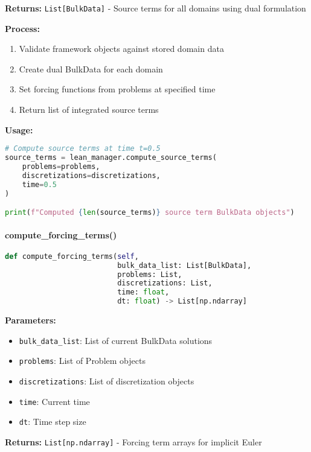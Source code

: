 \textbf{Returns:} \texttt{List[BulkData]} - Source terms for all domains using dual formulation

\textbf{Process:}
\begin{enumerate}
    \item Validate framework objects against stored domain data
    \item Create dual BulkData for each domain
    \item Set forcing functions from problems at specified time
    \item Return list of integrated source terms
\end{enumerate}

\textbf{Usage:}
\begin{lstlisting}[language=Python, caption=Source Terms Usage]
# Compute source terms at time t=0.5
source_terms = lean_manager.compute_source_terms(
    problems=problems,
    discretizations=discretizations,
    time=0.5
)

print(f"Computed {len(source_terms)} source term BulkData objects")
\end{lstlisting}

\paragraph{compute\_forcing\_terms()}\leavevmode
\begin{lstlisting}[language=Python, caption=Compute Forcing Terms Method]
def compute_forcing_terms(self, 
                          bulk_data_list: List[BulkData],
                          problems: List,
                          discretizations: List, 
                          time: float, 
                          dt: float) -> List[np.ndarray]
\end{lstlisting}

\textbf{Parameters:}
\begin{itemize}
    \item \texttt{bulk\_data\_list}: List of current BulkData solutions
    \item \texttt{problems}: List of Problem objects
    \item \texttt{discretizations}: List of discretization objects
    \item \texttt{time}: Current time
    \item \texttt{dt}: Time step size
\end{itemize}

\textbf{Returns:} \texttt{List[np.ndarray]} - Forcing term arrays for implicit Euler

